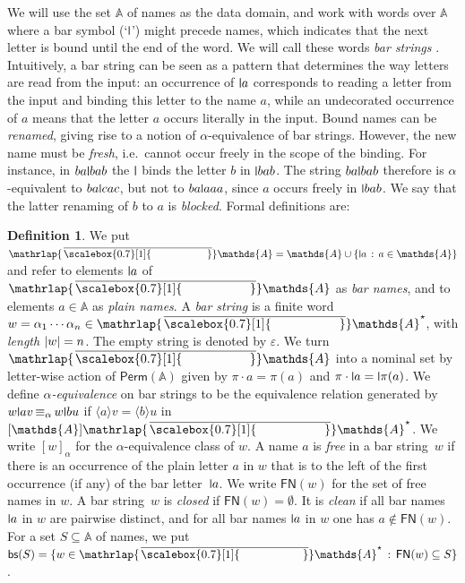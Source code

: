 \documentclass[10pt,a4paper]{amsart}
\theoremstyle{definition}
\newtheorem{defn}[theo]{Definition}
\newcommand{\seq}{\subseteq}
\newcommand{\At}{\mathds{A}}
\newcommand{\barAs}{\barNames^{\star}}
\newcommand{\bars}{\mathsf{bs}}
\newcommand{\card}[1]{\left\vert#1\right\vert}
\let\abs\card
\newcommand{\Perm}{\mathsf{Perm}}
\newcommand{\names}{\At}
\newcommand{\Abstr}[2][\names]{[#1]#2}
\newcommand{\braket}[1]{\langle #1 \rangle}
\newcommand{\setw}[2]{\{#1\,:\,#2\}}
\DeclareMathOperator{\alphaequiv}{\equiv_{\alpha}}
\newcommand{\mybar}[3]{%
  \mathrlap{\hspace{#2}\overline{\scalebox{#1}[1]{\phantom{\ensuremath{#3}}}}}\ensuremath{#3}
}
\newcommand{\FN}{\mathsf{FN}}
\newcommand{\barNames}{{\mybar{0.7}{1.25pt}{\names}}}
\newcommand{\midmid}{\hspace{0.2ex}{\rule[-0.1ex]{0.6pt}{1.65ex}}\hspace{0.2ex}}
\newcommand{\newletter}[1]{{\midmid}#1}
\let\originalleft\left
\let\originalright\right
\renewcommand{\left}{\mathopen{}\mathclose\bgroup\originalleft}
\renewcommand{\right}{\aftergroup\egroup\originalright}
\renewcommand{\enquote}[1]{`#1'}
\begin{document}
We will use the set $\names$ of names as the data domain, and work with words over $\At$ where a bar symbol (\enquote{$\midmid$}) might precede names, which indicates that the next letter is bound until the end of the word.
We will call these words \emph{bar strings} \cite{skmw17}.
Intuitively, a bar string can be seen as a pattern that determines the way letters are read from the input: an occurrence of $\newletter{a}$ corresponds to reading a letter from the input and binding this letter to the name $a$, while an undecorated occurrence of $a$ means that the letter $a$ occurs literally in the input.
Bound names can be \emph{renamed}, giving rise to a notion of $\alpha$-equivalence of bar strings.
However, the new name must be \emph{fresh}, i.e.~cannot occur freely in the scope of the binding.
For instance, in $ba\newletter{b}ab$ the $\midmid$ binds the letter $b$ in $\newletter{b}ab$.
The string $ba\newletter{b}ab$ therefore is $\alpha$-equivalent to $ba\newletter{c}ac$, but not to $ba\newletter{a}aa$, since $a$ occurs freely in $\newletter{b}ab$.
We say that the latter renaming of $b$ to $a$ is \emph{blocked}.
Formal definitions are:%

\begin{defn}
  We put $\barNames = \names \cup \setw{\newletter{a}}{a \in \names}$ and refer to elements $\newletter{a}$ of $\barNames$ as \emph{bar names}, and to elements $a \in \names$ as \emph{plain names}.
  A \emph{bar string} is a finite word $w = \alpha_1 \cdots \alpha_n \in \barAs$, with \emph{length} $\abs{w} = n$.
  The empty string is denoted by $\varepsilon$.
  We turn $\barNames$ into a nominal set by letter-wise action of $\Perm(\names)$ given by $\pi \cdot a = \pi(a)$ and $\pi \cdot \newletter{a} = \newletter{\pi(a)}$.
  We define \emph{$\alpha$-equivalence} on bar strings to be the equivalence relation generated by $w\newletter{a}v \alphaequiv w\newletter{b}u$ if $\braket{a}v = \braket{b}u$ in $\Abstr{\barAs}$.
  We write $[w]_\alpha$ for the $\alpha$-equivalence class of $w$.
  A name $a$ is \emph{free} in a bar string~$w$ if there is an occurrence of the plain letter $a$ in $w$ that is to the left of the first occurrence (if any) of the bar letter~$\newletter{a}$.
  We write $\FN(w)$ for the set of free names in $w$.
  A bar string~$w$ is \emph{closed} if $\FN(w) = \emptyset$.
  It is \emph{clean} if all bar names $\newletter{a}$ in $w$ are pairwise
    distinct, and for all bar names $\newletter{a}$ in $w$ one has $a \notin \FN(w)$. For a set $S \seq \names$ of names, we put $\bars(S) =
    \setw{w \in \barAs}{\FN(w) \seq S}$.
\end{defn}
\end{document}
